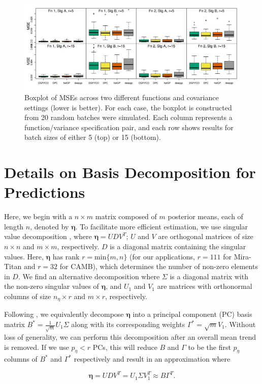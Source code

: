 \documentclass[11pt]{article}
\begin{document}
\begin{figure}[H]
    \centering
    \includegraphics[width=\textwidth]{sims_MSE.jpeg}
    \caption{Boxplot of MSEs across two different functions and covariance settings 
             (lower is better). For each case, the boxplot is constructed from 20 
             random batches were simulated. Each column represents a function/variance 
             specification pair, and each row shows results for batch sizes of 
             either 5 (top) or 15 (bottom).}    
    \label{fig:sims_MSE}
\end{figure}

\section{Details on Basis Decomposition for Predictions}
\label{sec:apdx_basis}

Here, we begin with a $n \times m$ matrix composed of $m$ posterior means, 
each of length $n$, denoted by $\boldsymbol\eta$. To facilitate more efficient estimation, 
we use singular value decomposition \citep[SVD; e.g.,][]{banerjee2014linear}, 
where $\boldsymbol\eta = UDV^T$; $U$ and $V$ are orthogonal matrices of size $n \times n$ 
and $m\times m$, respectively. $D$ is a diagonal matrix containing the singular values. 
Here, $\boldsymbol\eta$ has rank $r=\text{min}\{m,n\}$ (for our applications, $r=111$ for Mira-Titan 
and $r=32$ for CAMB), which determines the number of non-zero elements in $D$. We find an alternative 
decomposition where $\Sigma$ is a diagonal matrix with the non-zero singular values of 
$\boldsymbol\eta$, and $U_1$ and $V_1$ are matrices with orthonormal columns of size 
$n_\eta \times r$ and $m \times r$, respectively. 

Following \cite{higdon2008computer, higdon2010estcosmo}, we equivalently decompose 
$\boldsymbol\eta$ into a principal component (PC) basis matrix 
$B^* = \frac{1}{\sqrt{m}}U_1\Sigma$ along with its corresponding weights 
$\Gamma^* = \sqrt{m}V_1$. Without loss of generality, we can perform this decomposition 
after an overall mean trend is removed. If we use $p_\eta < r$ PCs, this will reduce 
$B$ and $\Gamma$ to be the first $p_\eta$ columns of $B^*$ and $\Gamma^*$ respectively and 
result in an approximation where 

\begin{equation}
    \boldsymbol\eta= UDV^T = U_1\Sigma V_1^T \approx B\Gamma^T.
\end{equation}



\end{document}
